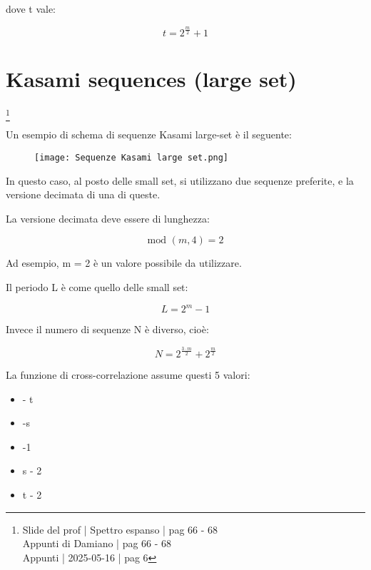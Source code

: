 dove t vale: 

{
    \Large 
    \begin{equation}
        t = 2^{\frac{m}{2}} + 1
    \end{equation}
}

\newpage 

\section{Kasami sequences (large set)}
\footnote{Slide del prof | Spettro espanso | pag 66 - 68\\
Appunti di Damiano | pag 66 - 68\\
Appunti | 2025-05-16 | pag 6 
} 

Un esempio di schema di sequenze Kasami large-set è il seguente: 

\begin{figure}[h]
    \centering
    \texttt{[image: Sequenze Kasami large set.png]}
\end{figure}

In questo caso, 
al posto delle small set, 
si utilizzano due sequenze preferite, 
e la versione decimata di una di queste. \newline 

La versione decimata deve essere di lunghezza: 

{
    \Large 
    \begin{equation}
        \text{mod }
        (m, 4) = 2
    \end{equation}
}

Ad esempio, m = 2 è un valore possibile da utilizzare. \newline 

Il periodo L è come quello delle small set:

{
    \Large
    \begin{equation}
        L = 2^{m} - 1
    \end{equation}
}

Invece il numero di sequenze N è diverso, 
cioè:

{
    \Large 
    \begin{equation}
        N = 2^{\frac{3 \cdot m}{2}} + 2^{\frac{m}{2}} 
    \end{equation}
}

La funzione di cross-correlazione assume questi 5 valori: 

\begin{itemize}
    \item - t 
    \item -s 
    \item -1 
    \item s - 2 
    \item t - 2  
\end{itemize}

